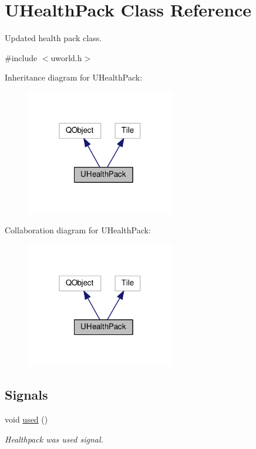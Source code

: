 \hypertarget{classUHealthPack}{}\section{U\+Health\+Pack Class Reference}
\label{classUHealthPack}


Updated health pack class.  




{\ttfamily \#include $<$uworld.\+h$>$}



Inheritance diagram for U\+Health\+Pack\+:\nopagebreak
\begin{figure}[H]
\begin{center}
\leavevmode
\includegraphics[width=184pt]{d5/dd8/classUHealthPack__inherit__graph}
\end{center}
\end{figure}


Collaboration diagram for U\+Health\+Pack\+:\nopagebreak
\begin{figure}[H]
\begin{center}
\leavevmode
\includegraphics[width=184pt]{df/da1/classUHealthPack__coll__graph}
\end{center}
\end{figure}
\subsection*{Signals}
\begin{DoxyCompactItemize}
\item 
void \hyperlink{classUHealthPack_a1f5645d92da31de8300ad6885875cf92}{used} ()\hypertarget{classUHealthPack_a1f5645d92da31de8300ad6885875cf92}{}\label{classUHealthPack_a1f5645d92da31de8300ad6885875cf92}

\begin{DoxyCompactList}\small\item\em Healthpack was used signal. \end{DoxyCompactList}\end{DoxyCompactItemize}
